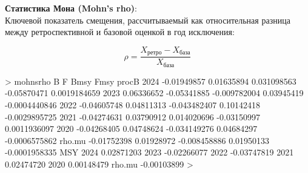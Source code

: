 \documentclass[
  letterpaper,
  DIV=11,
  numbers=noendperiod]{scrreprt}
\newenvironment{Shaded}{\begin{snugshade}}{\end{snugshade}}
\newcommand{\DecValTok}[1]{\textcolor[rgb]{0.68,0.00,0.00}{#1}}
\newcommand{\FloatTok}[1]{\textcolor[rgb]{0.68,0.00,0.00}{#1}}
\newcommand{\NormalTok}[1]{\textcolor[rgb]{0.00,0.23,0.31}{#1}}
\newcommand{\SpecialCharTok}[1]{\textcolor[rgb]{0.37,0.37,0.37}{#1}}
\begin{document}
\textbf{Статистика Мона (Mohn's rho)}:\\
Ключевой показатель смещения, рассчитываемый как относительная разница
между ретроспективной и базовой оценкой в год исключения:

\[
\rho = \frac{X_{\text{ретро}} - X_{\text{база}}}{X_{\text{база}}}
\]

\begin{Shaded}
\begin{Highlighting}[]
\SpecialCharTok{\textgreater{}}\NormalTok{ mohnsrho}
\NormalTok{                 B           F         Bmsy        Fmsy         procB}
\DecValTok{2024}   \SpecialCharTok{{-}}\FloatTok{0.01949857}  \FloatTok{0.01635894}  \FloatTok{0.031098563} \SpecialCharTok{{-}}\FloatTok{0.05870471}  \FloatTok{0.0019184659}
\DecValTok{2023}    \FloatTok{0.06336652} \SpecialCharTok{{-}}\FloatTok{0.05341885} \SpecialCharTok{{-}}\FloatTok{0.009782004}  \FloatTok{0.03945419} \SpecialCharTok{{-}}\FloatTok{0.0004440846}
\DecValTok{2022}   \SpecialCharTok{{-}}\FloatTok{0.04605748}  \FloatTok{0.04811313} \SpecialCharTok{{-}}\FloatTok{0.043482407}  \FloatTok{0.10142418} \SpecialCharTok{{-}}\FloatTok{0.0029895725}
\DecValTok{2021}   \SpecialCharTok{{-}}\FloatTok{0.04274631}  \FloatTok{0.03790912}  \FloatTok{0.014020696} \SpecialCharTok{{-}}\FloatTok{0.03150997}  \FloatTok{0.0011936097}
\DecValTok{2020}   \SpecialCharTok{{-}}\FloatTok{0.04268405}  \FloatTok{0.04748624} \SpecialCharTok{{-}}\FloatTok{0.034149276}  \FloatTok{0.04684297} \SpecialCharTok{{-}}\FloatTok{0.0006575862}
\NormalTok{rho.mu }\SpecialCharTok{{-}}\FloatTok{0.01752398}  \FloatTok{0.01928972} \SpecialCharTok{{-}}\FloatTok{0.008458886}  \FloatTok{0.01950133} \SpecialCharTok{{-}}\FloatTok{0.0001958335}
\NormalTok{               MSY}
\DecValTok{2024}    \FloatTok{0.02871203}
\DecValTok{2023}   \SpecialCharTok{{-}}\FloatTok{0.02266077}
\DecValTok{2022}   \SpecialCharTok{{-}}\FloatTok{0.03747819}
\DecValTok{2021}    \FloatTok{0.02474720}
\DecValTok{2020}    \FloatTok{0.00148479}
\NormalTok{rho.mu }\SpecialCharTok{{-}}\FloatTok{0.00103899}
\SpecialCharTok{\textgreater{}} 
\end{Highlighting}
\end{Shaded}
\end{document}
